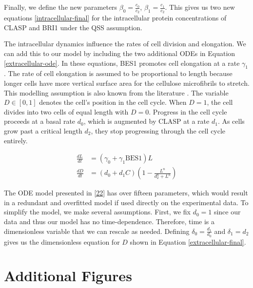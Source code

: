 \documentclass[referee,pdflatex,sn-mathphys-num]{sn-jnl}
\begin{document}
\begin{appendices}
Finally, we define the new parameters $\beta_{0} = \frac{c_{0}}{c_{2}}$, $\beta_{1} = \frac{c_{1}}{c_{2}}$.
This gives us two new equations \eqref{intracellular-final} for the intracellular protein concentrations of CLASP and BRI1 under the QSS assumption.

The intracellular dynamics influence the rates of cell division and elongation.
We can add this to our model by including the two additional ODEs in Equation \eqref{extracellular-ode}.
In these equations, BES1 promotes cell elongation at a rate $\gamma_{1}$.
The rate of cell elongation is assumed to be proportional to length because longer cells have more vertical surface area for the cellulose microfibrils to stretch.
This modelling assumption is also known from the literature \cite{lockhart1965, smithers2024}.
The variable $D \in [0, 1]$ denotes the cell's position in the cell cycle.
When $D = 1$, the cell divides into two cells of equal length with $D = 0$.
Progress in the cell cycle proceeds at a basal rate $d_{0}$, which is augmented by CLASP at a rate $d_{1}$.
As cells grow past a critical length $d_{2}$, they stop progressing through the cell cycle entirely. 

\begin{equation}
\label{extracellular-ode}
\begin{aligned}
  \frac{ dL }{ dt } &= \left(\gamma_{0} + \gamma_{1}\text{BES1}\right)L  \\[5pt]
\frac{ dD }{ dt } &= (d_{0} + d_{1}C)\left( 1 - \frac{ L^{ n } }{ d_{2}^{ n } + L^{ n } } \right) 
\end{aligned}
\end{equation}

The ODE model presented in \ref{22} has over fifteen parameters, which would result in a redundant and overfitted model if used directly on the experimental data.
To simplify the model, we make several assumptions.
First, we fix $d_{0} = 1$ since our data and thus our model has no time-dependence.
Therefore, time is a dimensionless variable that we can rescale as needed.
Defining $\delta_{0} = \frac{d_{1}}{d_{0}}$ and $\delta_{1} = d_{2}$ gives us the dimensionless equation for $D$ shown in Equation \eqref{extracellular-final}.


\section{Additional Figures}\label{secA3}


\end{appendices}
\end{document}

